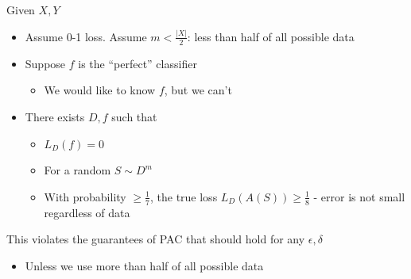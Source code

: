 \documentclass[7.5pt,a4paper, landscape]{article}
\begin{document}
\begin{multicols*}{4}
{\begin{minipage}[t]{\linewidth}
Given \( X, Y \)
\begin{itemize}
    \item Assume 0-1 loss. Assume \( m < \frac{|X|}{2} \): less than half of all possible data
    \item Suppose \( f \) is the ``perfect'' classifier
    \begin{itemize}
        \item We would like to know \( f \), but we can't
    \end{itemize}
    \item There exists \( D, f \) such that
    \begin{itemize}
        \item \( L_D(f) = 0 \)
        \item For a random \( S \sim D^m \)
        \item With probability \( \geq \frac{1}{7} \), the true loss \( L_D(A(S)) \geq \frac{1}{8} \) - error is not small regardless of data
    \end{itemize}
\end{itemize}

This violates the guarantees of PAC that should hold for any \( \epsilon, \delta \)
\begin{itemize}
    \item Unless we use more than half of all possible data
\end{itemize}
\end{minipage}}




\end{multicols*}
\end{document}
